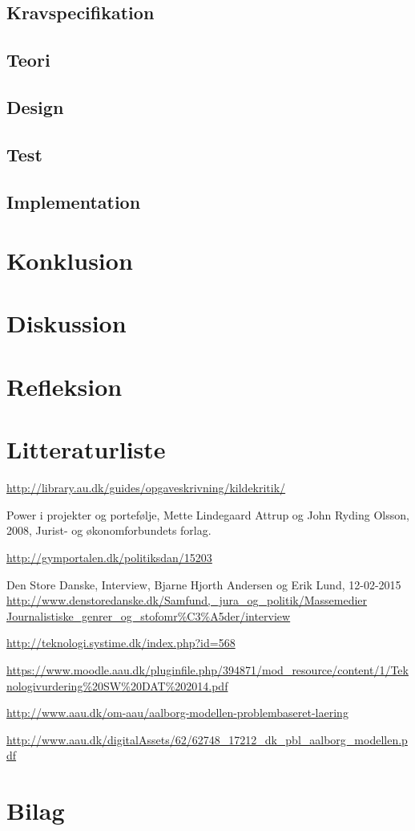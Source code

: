 \documentclass[11pt, twoside, a4paper, openright]{report}
\begin{document}
	\section{Kravspecifikation}
	\section{Teori}
	\section{Design}
	\section{Test}
	\section{Implementation}

\chapter{Konklusion}

\chapter{Diskussion}

\chapter{Refleksion}
		
\chapter{Litteraturliste}
\url{http://library.au.dk/guides/opgaveskrivning/kildekritik/}

Power i projekter og portefølje, Mette Lindegaard Attrup og John Ryding Olsson, 2008, Jurist- og økonomforbundets forlag.

\url{http://gymportalen.dk/politiksdan/15203}

Den Store Danske, Interview, Bjarne Hjorth Andersen og Erik Lund, 12-02-2015
\url{http://www.denstoredanske.dk/Samfund,_jura_og_politik/Massemedier Journalistiske_genrer_og_stofomr%C3%A5der/interview}

\url{http://teknologi.systime.dk/index.php?id=568}

\url{https://www.moodle.aau.dk/pluginfile.php/394871/mod_resource/content/1/Teknologivurdering%20SW%20DAT%202014.pdf}

\url{http://www.aau.dk/om-aau/aalborg-modellen-problembaseret-laering}

\url{http://www.aau.dk/digitalAssets/62/62748_17212_dk_pbl_aalborg_modellen.pdf}

\chapter{Bilag}
\end{document}
